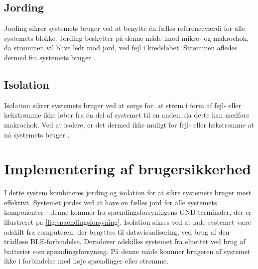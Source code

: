 \subsection{Jording}
Jording sikrer systemets bruger ved at benytte én fælles referenceværdi for alle systemets blokke. Jording beskytter på denne måde imod mikro- og makrochok, da strømmen vil blive ledt mod jord, ved fejl i kredsløbet. Strømmen afledes dermed fra systemets bruger \citep{webster1998}.

\subsection{Isolation}
Isolation sikrer systemets bruger ved at sørge for, at strøm i form af fejl- eller lækstrømme ikke løber fra én del af systemet til en anden, da dette kan medføre makrochok. Ved at isolere, er det dermed ikke muligt for fejl- eller lækstrømme at nå systemets bruger \citep{webster1998}. 

\section{Implementering af brugersikkerhed}
I dette system kombineres jording og isolation for at sikre systemets bruger mest effektivt. Systemet jordes ved at have en fælles jord for alle systemets komponenter - denne kommer fra spændingsforsyningens GND-terminaler, der er illustreret på \autoref{fig:spaendingsforsyning}. Isolation sikres ved at lade systemet være adskilt fra computeren, der benyttes til datavisualisering, ved brug af den trådløse BLE-forbindelse. Derudover adskilles systemet fra elnettet ved brug af batterier som spændingsforsyning. På denne måde kommer brugeren af systemet ikke i forbindelse med høje spændinger eller strømme. 

